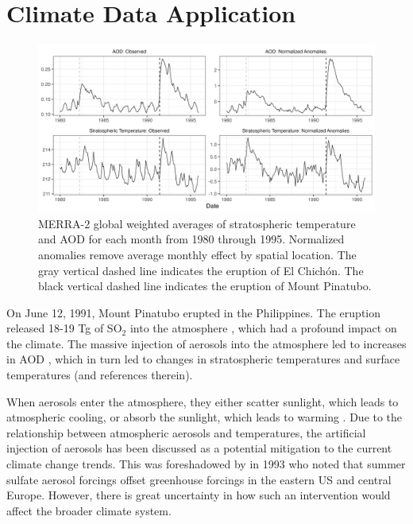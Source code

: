 \documentclass[AMS,STIX2COL]{WileyNJD-v2}
\begin{document}
\section{Climate Data Application} \label{sec:merra2}

\begin{figure}
    \centering
    \includegraphics[width=\textwidth]{figures/merra2_weighted_global_averages.png}
    \caption{MERRA-2 global weighted averages of stratospheric temperature and AOD for each month from 1980 through 1995. Normalized anomalies remove average monthly effect by spatial location. The gray vertical dashed line indicates the eruption of El Chich\'{o}n. The black vertical dashed line indicates the eruption of Mount Pinatubo.}
    \label{fig:merra2}
\end{figure}

On June 12, 1991, Mount Pinatubo erupted in the Philippines. The eruption released 18-19 Tg of SO$_2$ into the atmosphere \citep{guo2004}, which had a profound impact on the climate. The massive injection of aerosols into the atmosphere led to increases in AOD \citep{sato1993, guo2004}, which in turn led to changes in stratospheric temperatures and surface temperatures \citep{sato1993, liepert2002} (and references therein).

When aerosols enter the atmosphere, they either scatter sunlight, which leads to atmospheric cooling, or absorb the sunlight, which leads to warming \citep{liepert2002,myhre2013}. Due to the relationship between atmospheric aerosols and temperatures, the artificial injection of aerosols has been discussed as a potential mitigation to the current climate change trends. This was foreshadowed by \citet{kiehl1993} in 1993 who noted that summer sulfate aerosol forcings offset greenhouse forcings in the eastern US and central Europe. However, there is great uncertainty in how such an intervention would affect the broader climate system.
\end{document}
